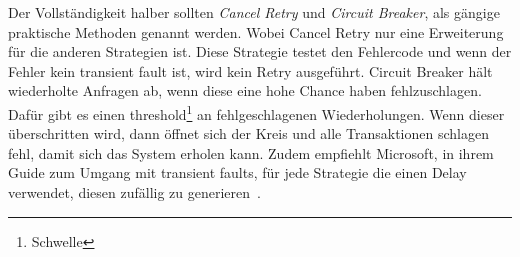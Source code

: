 Der Vollständigkeit halber sollten \emph{Cancel Retry} und \emph{Circuit Breaker}, als gängige praktische Methoden
genannt werden.
Wobei Cancel Retry nur eine Erweiterung für die anderen Strategien ist.
Diese Strategie testet den Fehlercode und wenn der Fehler kein transient fault ist, wird kein Retry ausgeführt.
Circuit Breaker hält wiederholte Anfragen ab, wenn diese eine hohe Chance haben fehlzuschlagen.
Dafür gibt es einen threshold\footnote{Schwelle} an fehlgeschlagenen Wiederholungen.
Wenn dieser überschritten wird, dann öffnet sich der Kreis und alle Transaktionen schlagen fehl, damit sich das
System erholen kann.
Zudem empfiehlt Microsoft, in ihrem Guide zum Umgang mit transient faults, für jede Strategie die einen Delay
verwendet, diesen zufällig zu generieren~\cite{MicrosoftTransientFaults}.
